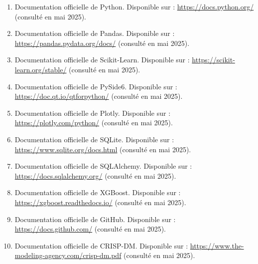 \documentclass[A4wide,12pt]{report}
\begin{document}
\begin{enumerate}
    \item Documentation officielle de Python. Disponible sur : \url{https://docs.python.org/} (consulté en mai 2025).
    \item Documentation officielle de Pandas. Disponible sur : \url{https://pandas.pydata.org/docs/} (consulté en mai 2025).
    \item Documentation officielle de Scikit-Learn. Disponible sur : \url{https://scikit-learn.org/stable/} (consulté en mai 2025).
    \item Documentation officielle de PySide6. Disponible sur : \url{https://doc.qt.io/qtforpython/} (consulté en mai 2025).
    \item Documentation officielle de Plotly. Disponible sur : \url{https://plotly.com/python/} (consulté en mai 2025).
    \item Documentation officielle de SQLite. Disponible sur : \url{https://www.sqlite.org/docs.html} (consulté en mai 2025).
    \item Documentation officielle de SQLAlchemy. Disponible sur : \url{https://docs.sqlalchemy.org/} (consulté en mai 2025).
    \item Documentation officielle de XGBoost. Disponible sur : \url{https://xgboost.readthedocs.io/} (consulté en mai 2025).
    \item Documentation officielle de GitHub. Disponible sur : \url{https://docs.github.com/} (consulté en mai 2025).
    \item Documentation officielle de CRISP-DM. Disponible sur : \url{https://www.the-modeling-agency.com/crisp-dm.pdf} (consulté en mai 2025).
\end{enumerate}


\cleardoublepage
\appendix 
{}
{} 


\thispagestyle{empty}

\cleardoublepage
\pagestyle{empty}     %
\thispagestyle{empty} %

\end{document}
